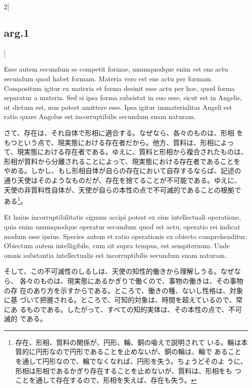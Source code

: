 \documentclass[paper=a4paper,fontsize=10pt,jafontsize=9pt,titlepage]{jlreq}
\begin{document}
\begin{paracol}{2}[\subsection{arg.1}]
\switchcolumn*

Esse autem secundum se competit formae, unumquodque enim est ens actu
secundum quod habet formam. Materia vero est ens actu per
formam. Compositum igitur ex materia et forma desinit esse actu per
hoc, quod forma separatur a materia. Sed si ipsa forma subsistat in
suo esse, sicut est in Angelis, ut dictum est, non potest amittere
esse. Ipsa igitur immaterialitas Angeli est ratio quare Angelus est
incorruptibilis secundum suam naturam.

\switchcolumn

さて、存在は、それ自体で形相に適合する。なぜなら、各々のものは、形相
をもつという点で、現実態における存在者だから。他方、質料は、形相によっ
て、現実態における存在者である。ゆえに、質料と形相から複合されたものは、
形相が質料から分離されることによって、現実態における存在者であることを
やめる。しかし、もし形相自体が自らの存在において自存するならば、記述の
通り天使はそのようなものだが、存在を捨てることが不可能である。ゆえに、
天使の非質料性自体が、天使が自らの本性の点で不可滅的であることの根拠で
ある\footnote{存在、形相、質料の関係が、円形、輪、銅の喩えで説明されて
いる。輪は本質的に円形なので円形であることを止めないが、銅の輪は、輪で
あることを通して円形なので、輪でなくなれば、円形を失う。ちょうどそのよ
うに、形相は形相であるかぎり存在することを止めないが、質料は、形相をも
つことを通して存在するので、形相を失えば、存在も失う。}。

\switchcolumn*

Et huius incorruptibilitatis signum accipi potest
ex eius intellectuali operatione, quia enim unumquodque operatur
secundum quod est actu, operatio rei indicat modum esse ipsius. Species
autem et ratio operationis ex obiecto comprehenditur. Obiectum autem
intelligibile, cum sit supra tempus, est sempiternum. Unde omnis
substantia intellectualis est incorruptibilis secundum suam naturam.

\switchcolumn

そして、この不可滅性のしるしは、天使の知性的働きから理解しうる。なぜなら、
 各々のものは、現実態にあるかぎりで働くので、事物の働きは、その事物の存
 在のあり方を示すからである。ところで、働きの種、ないし性格は、対象に基
 づいて把握される。ところで、可知的対象は、時間を超えているので、常にあ
 るものである。したがって、すべての知的実体は、その本性の点で、不可滅的
 である。

\switchcolumn*[\subsection{ad.1}]


\end{paracol}
\end{document}
